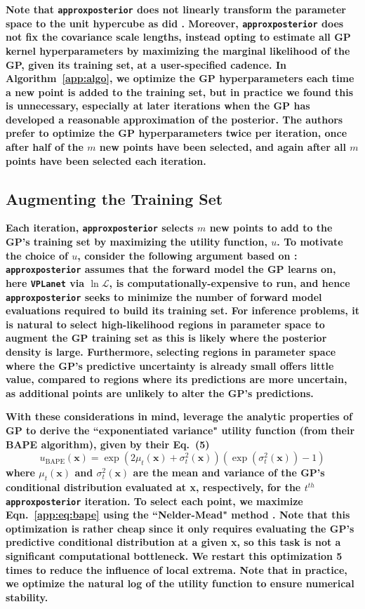 \documentclass[twocolumn]{aastex62}
\newcommand{\xxx}[1]{{\textbf{#1}}}
\newcommand{\vplanet}[0]{\texttt{VPLanet}\xspace}
\newcommand{\approxposterior}[0]{\texttt{approxposterior}\xspace}
\begin{document}
\xxx{Note that \approxposterior does not linearly transform the parameter space to the unit hypercube as did \citet{Kandasamy2017}. Moreover, \approxposterior does not fix the covariance scale lengths, instead opting to estimate all GP kernel hyperparameters by maximizing the marginal likelihood of the GP, given its training set, at a user-specified cadence. In Algorithm~\ref{app:algo}, we optimize the GP hyperparameters each time a new point is added to the training set, but in practice we found this is unnecessary, especially at later iterations when the GP has developed a reasonable approximation of the posterior. The authors prefer to optimize the GP hyperparameters twice per iteration, once after half of the $m$ new points have been selected, and again after all $m$ points have been selected each iteration.}

\subsection{Augmenting the Training Set} \label{app:augment}

\xxx{Each iteration, \approxposterior selects $m$ new points to add to the GP's training set by maximizing the utility function, $u$. To motivate the choice of $u$, consider the following argument based on \citet{Kandasamy2017}: \approxposterior assumes that the forward model the GP learns on, here \vplanet via $\ln \mathcal{L}$, is computationally-expensive to run, and hence \approxposterior seeks to minimize the number of forward model evaluations required to build its training set. For inference problems, it is natural to select high-likelihood regions in parameter space to augment the GP training set as this is likely where the posterior density is large. Furthermore, selecting regions in parameter space where the GP's predictive uncertainty is already small offers little value, compared to regions where its predictions are more uncertain, as additional points are unlikely to alter the GP's predictions.} 

\xxx{With these considerations in mind, \citet{Kandasamy2017} leverage the analytic properties of GP to derive the ``exponentiated variance" utility function (from their BAPE algorithm), given by their Eq.~(5)}
\begin{equation} \label{app:eq:bape}
    u_{\textrm{BAPE}}(\textbf{x}) = \exp(2 \mu_t(\textbf{x}) + \sigma_t^2(\textbf{x}))(\exp(\sigma_t^2(\textbf{x})) - 1)
\end{equation}
\xxx{where $\mu_t(\textbf{x})$ and $\sigma_t^2(\textbf{x})$ are the mean and variance of the GP's conditional distribution evaluated at \textbf{x}, respectively, for the $t^{th}$ \approxposterior iteration. To select each point, we maximize Eqn.~\ref{app:eq:bape} using the ``Nelder-Mead" method \citep{Nelder1965}. Note that this optimization is rather cheap since it only requires evaluating the GP's predictive conditional distribution at a given \textbf{x}, so this task is not a significant computational bottleneck. We restart this optimization 5 times to reduce the influence of local extrema. Note that in practice, we optimize the natural log of the utility function to ensure numerical stability.}
\end{document}
